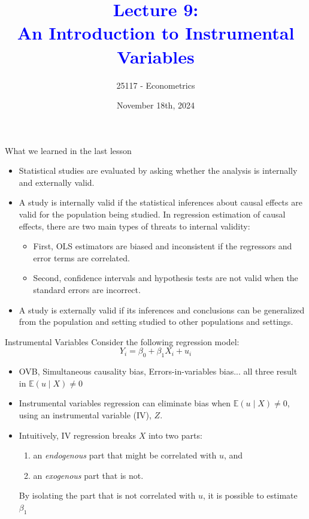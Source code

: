 \documentclass[notes,10pt, aspectratio=169]{beamer}
\title[]{\textcolor{blue}{Lecture 9:\\An Introduction to Instrumental Variables}}
\author{25117 - Econometrics}
\institute[shortinst]{Universitat Pompeu Fabra}
\date{November 18th, 2024}
\begin{document}
\begin{frame}[plain]
\maketitle
\end{frame}



\begin{frame}{What we learned in the last lesson}
\begin{itemize}
    \item Statistical studies are evaluated by asking whether the analysis is internally and externally valid.\\[1em]
    \item A study is internally valid if the statistical inferences about causal effects are valid for the population being studied. In regression estimation of causal effects, there are two main types of threats to internal validity:
    \begin{itemize}
        \item First, OLS estimators are biased and inconsistent if the regressors and error terms are correlated.
        \item Second, confidence intervals and hypothesis tests are not valid when the standard errors are incorrect.
    \end{itemize}
    \vspace{1em}
    \item A study is externally valid if its inferences and conclusions can be generalized from the population and setting studied to other populations and settings.
\end{itemize} 
\end{frame}


\begin{frame}{Instrumental Variables}
Consider the following regression model:
\begin{equation*}
    Y_i = \beta_0 + \beta_1 X_i + u_i
\end{equation*}
\begin{itemize}
    \item OVB,  Simultaneous causality bias, Errors-in-variables bias... all three result in $\mathbb{E}(u\mid X)\neq0$\\[1em]
    \item Instrumental variables regression can eliminate bias when $\mathbb{E}(u\mid X)\neq0$, using an instrumental variable (IV), $Z$.\\[1em]
    \item Intuitively, IV regression breaks $X$ into two parts:
    \begin{enumerate}
        \item an \textit{endogenous} part that might be correlated with $u$, and 
        \item an \textit{exogenous}  part that is not. 
    \end{enumerate}
    \vspace{1em}
By isolating the part that is not correlated with $u$, it is possible to estimate $\beta_1$
\end{itemize}
\end{frame}
\end{document}
